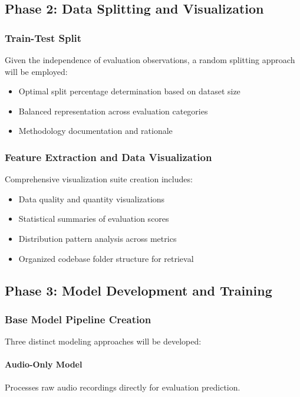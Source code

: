 \documentclass[12pt]{article}
\begin{document}
\subsection{Phase 2: Data Splitting and Visualization}

\subsubsection{Train-Test Split}
Given the independence of evaluation observations, a random splitting approach will be employed:
\begin{itemize}
    \item Optimal split percentage determination based on dataset size
    \item Balanced representation across evaluation categories
    \item Methodology documentation and rationale
\end{itemize}

\subsubsection{Feature Extraction and Data Visualization}
Comprehensive visualization suite creation includes:
\begin{itemize}
    \item Data quality and quantity visualizations
    \item Statistical summaries of evaluation scores
    \item Distribution pattern analysis across metrics
    \item Organized codebase folder structure for retrieval
\end{itemize}

\subsection{Phase 3: Model Development and Training}

\subsubsection{Base Model Pipeline Creation}
Three distinct modeling approaches will be developed:

\paragraph{Audio-Only Model} Processes raw audio recordings directly for evaluation prediction.
\end{document}
